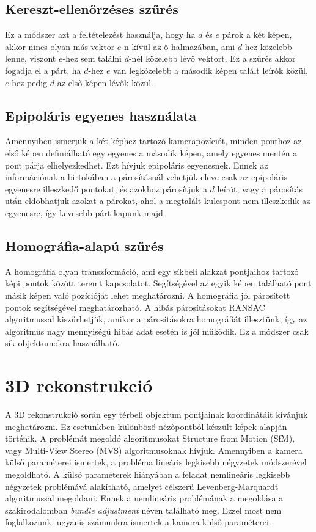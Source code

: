 \documentclass{article}
\begin{document}
	\subsection{Kereszt-ellenőrzéses szűrés}
	Ez a módszer azt a feltételezést használja, hogy ha $d$ és $e$ párok a két képen, akkor nincs olyan más vektor $e$-n kívül az ő halmazában, ami $d$-hez közelebb lenne, viszont $e$-hez sem találni $d$-nél közelebb lévő vektort. Ez a szűrés akkor fogadja el a párt, ha $d$-hez $e$ van legközelebb a második képen talált leírók közül, $e$-hez pedig $d$ az első képen lévők közül.
	
	\subsection{Epipoláris egyenes használata}
	Amennyiben ismerjük a két képhez tartozó kamerapozíciót, minden ponthoz az első képen definiálható egy egyenes a második képen, amely egyenes mentén a pont párja elhelyezkedhet. Ezt hívjuk epipoláris egyenesnek. Ennek az információnak a birtokában a párosításnál vehetjük eleve csak az epipoláris egyenesre illeszkedő pontokat, és azokhoz párosítjuk a $d$ leírót, vagy a párosítás után eldobhatjuk azokat a párokat, ahol a megtalált kulcspont nem illeszkedik az egyenesre, így kevesebb párt kapunk majd.
	
	\subsection{Homográfia-alapú szűrés}
	A homográfia olyan transzformáció, ami egy síkbeli alakzat pontjaihoz tartozó képi pontok között teremt kapcsolatot. Segítségével az egyik képen található pont másik képen való pozícióját lehet meghatározni. A homográfia jól párosított pontok segítségével meghatározható. A hibás párosításokat RANSAC algoritmussal kiszűrhetjük, amikor a párosításokra homográfiát illesztünk, így az algoritmus nagy mennyiségű hibás adat esetén is jól működik. Ez a módszer csak sík objektumokra használható.
	
	\section{3D rekonstrukció}
	A 3D rekonstrukció során egy térbeli objektum pontjainak koordinátáit kívánjuk meghatározni. Ez esetünkben különböző nézőpontból készült képek alapján történik. A problémát megoldó algoritmusokat Structure from Motion (SfM), vagy Multi-View Stereo (MVS) algoritmusoknak hívjuk. Amennyiben a kamera külső paraméterei ismertek, a probléma lineáris legkisebb négyzetek módszerével megoldható. A külső paraméterek hiányában a feladat nemlineáris legkisebb négyzetek problémává alakítható, amelyet célszerű Levenberg-Marquardt algoritmussal megoldani. Ennek a nemlineáris problémának a megoldása a szakirodalomban \textit{bundle adjustment} néven található meg. Ezzel most nem foglalkozunk, ugyanis számunkra ismertek a kamera külső paraméterei.
	
\end{document}
